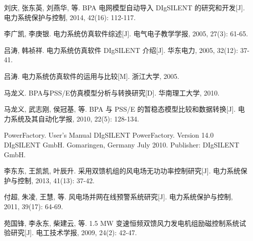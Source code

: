 \begin{thebibliography}{99} %

刘庆, 张东英, 刘燕华, 等. BPA 电网模型自动导入 DIgSILENT 的研究和开发[J]. 电力系统保护与控制, 2014, 42(16): 112-117.

李广凯, 李庚银. 电力系统仿真软件综述[J]. 电气电子教学学报, 2005, 27(3): 61-65.

吕涛, 韩祯祥. 电力系统仿真软件 DIgSILENT 介绍[J]. 华东电力, 2005, 32(12): 37-41.

吕涛. 电力系统仿真软件的运用与比较[M]. 浙江大学, 2005.

马龙义. BPA与PSS/E仿真模型分析与转换研究[D]. 华南理工大学, 2010.

马龙义, 武志刚, 侯冠基, 等. BPA 与 PSS/E 的暂稳态模型比较和数据转换[J]. 电力系统及其自动化学报, 2010, 22(5): 128-134.

PowerFactory. User's Manual DIgSILENT PowerFactory. Version 14.0 DIgSILENT GmbH. Gomaringen, Germany July 2010. Publisher: DIgSILENT GmbH. 

李东东, 王凯凯, 叶辰升. 采用双馈机组的风电场无功功率控制研究[J]. 电力系统保护与控制, 2013, 41(13): 37-42.

付超, 朱凌, 王慧, 等. 风电场并网在线预警系统研究[J]. 电力系统保护与控制, 2011, 39(17): 64-69.

苑国锋, 李永东, 柴建云, 等. 1.5 MW 变速恒频双馈风力发电机组励磁控制系统试验研究[J]. 电工技术学报, 2009, 24(2): 42-47.

\end{thebibliography}
